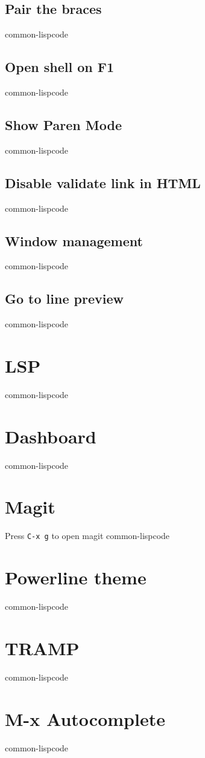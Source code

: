 \documentclass[11pt]{article}
\begin{document}
\subsection{Pair the braces}
\label{sec:orgd1db9fe}
common-lispcode
\subsection{Open shell on F1}
\label{sec:org091c392}
common-lispcode
\subsection{Show Paren Mode}
\label{sec:orgc1963f3}
common-lispcode
\subsection{Disable validate link in HTML}
\label{sec:org6aefc73}
common-lispcode
\subsection{Window management}
\label{sec:org32e952f}
common-lispcode
\subsection{Go to line preview}
\label{sec:org6bb7780}
common-lispcode
\section{LSP}
\label{sec:org4a118c8}
common-lispcode
\section{Dashboard}
\label{sec:orgfb56a34}
common-lispcode
\section{Magit}
\label{sec:orga9cce8b}

Press \texttt{C-x g} to open magit
common-lispcode
\section{Powerline theme}
\label{sec:orgcd88c71}
common-lispcode
\section{TRAMP}
\label{sec:org9ad715c}
common-lispcode
\section{M-x Autocomplete}
\label{sec:org8f7991e}
common-lispcode
\end{document}
